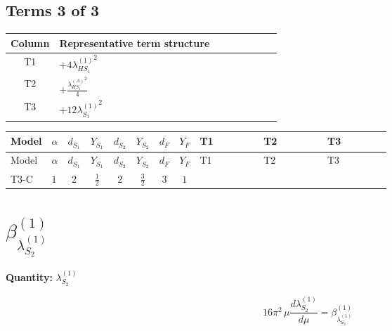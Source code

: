 \documentclass[8pt]{article}
\begin{document}
\begin{landscape}
\subsection*{Terms 3 of 3}
\begin{center}
\begin{tabular}{@{}c >{\raggedright\arraybackslash}p{0.82\linewidth}@{}}
\toprule
Column & Representative term structure \\
\midrule
T1 & \(\displaystyle +4 {\lambda_{HS_1}^{(1)}}^2\) \\
\midrule
T2 & \(\displaystyle +\frac{{\lambda_{HS_1}^{(A)}}^2}{4}\) \\
\midrule
T3 & \(\displaystyle +12 {\lambda_{S_1}^{(1)}}^2\) \\
\midrule
\bottomrule
\end{tabular}
\end{center}
\smallskip
\tiny
\begin{longtable}{@{}llcccccc >{\raggedright\arraybackslash}p{0.21\linewidth} >{\raggedright\arraybackslash}p{0.21\linewidth} >{\raggedright\arraybackslash}p{0.21\linewidth}@{}}
\toprule
Model & $\alpha$ & $d_{S_1}$ & $Y_{S_1}$ & $d_{S_2}$ & $Y_{S_2}$ & $d_F$ & $Y_F$ & T1 & T2 & T3 \\
\midrule
\endfirsthead
\toprule
Model & $\alpha$ & $d_{S_1}$ & $Y_{S_1}$ & $d_{S_2}$ & $Y_{S_2}$ & $d_F$ & $Y_F$ & T1 & T2 & T3 \\
\midrule
\endhead
T3-C & $1$ & $2$ & $\frac{1}{2}$ & $2$ & $\frac{3}{2}$ & $3$ & $1$ & \scriptsize\adjustbox{max width=\linewidth}{$\begin{gathered} +4 {\lambda_{HS_1}^{(1)}}^2\end{gathered}$} & \scriptsize\adjustbox{max width=\linewidth}{$\begin{gathered} +\frac{{\lambda_{HS_1}^{(A)}}^2}{4}\end{gathered}$} & \scriptsize\adjustbox{max width=\linewidth}{$\begin{gathered} +12 {\lambda_{S_1}^{(1)}}^2\end{gathered}$} \\
\midrule
\bottomrule
\end{longtable}
\clearpage
\section*{$\beta_{\lambda_{S_2}^{(1)}}^{(1)}$}
\noindent\textbf{Quantity: }$\lambda_{S_2}^{(1)}$\par\smallskip
\[16\pi^2\,\mu\frac{d \lambda_{S_2}^{(1)}}{d\mu}=\beta_{\lambda_{S_2}^{(1)}}^{(1)}\]

\end{landscape}
\end{document}
